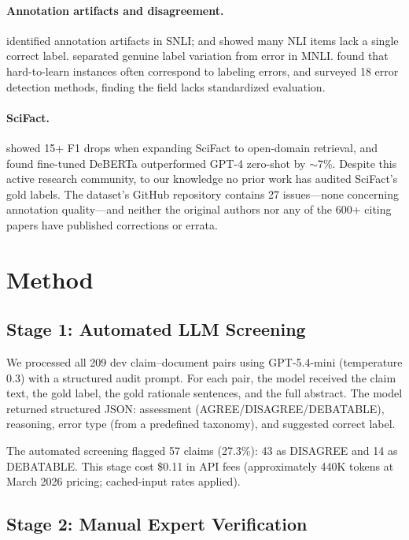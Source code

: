 \documentclass[11pt]{article}
\begin{document}
\paragraph{Annotation artifacts and disagreement.}
\citet{gururangan2018annotation} identified annotation artifacts in SNLI; \citet{pavlick2019inherent} and \citet{nie2020what} showed many NLI items lack a single correct label.
\citet{weber2024varierr} separated genuine label variation from error in MNLI.
\citet{swayamdipta2020dataset} found that hard-to-learn instances often correspond to labeling errors, and \citet{klie2023annotation} surveyed 18 error detection methods, finding the field lacks standardized evaluation.

\paragraph{SciFact.}
\citet{wadden2022scifactopen} showed 15+ F1 drops when expanding SciFact to open-domain retrieval, and \citet{kosprdic2024scientific} found fine-tuned DeBERTa outperformed GPT-4 zero-shot by ${\sim}$7\%.
Despite this active research community, to our knowledge no prior work has audited SciFact's gold labels.
The dataset's GitHub repository contains 27 issues---none concerning annotation quality---and neither the original authors nor any of the 600+ citing papers have published corrections or errata.

\section{Method}

\subsection{Stage 1: Automated LLM Screening}

We processed all 209 dev claim--document pairs using GPT-5.4-mini (temperature 0.3) with a structured audit prompt.
For each pair, the model received the claim text, the gold label, the gold rationale sentences, and the full abstract.
The model returned structured JSON: assessment (AGREE/DISAGREE/DEBATABLE), reasoning, error type (from a predefined taxonomy), and suggested correct label.

The automated screening flagged 57 claims (27.3\%): 43 as DISAGREE and 14 as DEBATABLE.
This stage cost \$0.11 in API fees (approximately 440K tokens at March 2026 pricing; cached-input rates applied).

\subsection{Stage 2: Manual Expert Verification}
\label{sec:stage2}
\end{document}
